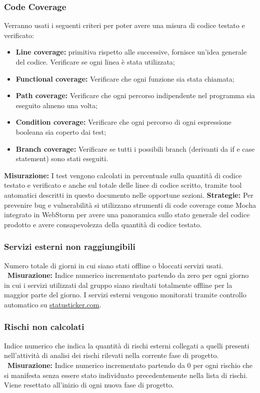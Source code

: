 	 	\subsubsection{Code Coverage} Verranno usati i seguenti criteri per poter avere una misura di codice testato e verificato:\newline
	 		\begin{itemize}
	 			\item \textbf{Line coverage:} primitiva rispetto alle successive, fornisce un’idea generale del codice. Verificare se ogni linea è stata utilizzata;
	 			\item \textbf{Functional coverage:} Verificare che ogni funzione sia stata chiamata;
	 			\item \textbf{Path coverage:} Verificare che ogni percorso indipendente nel programma sia eseguito almeno una volta;
	 			\item \textbf{Condition coverage:} Verificare che ogni percorso di ogni espressione booleana sia coperto dai test;
	 			\item \textbf{Branch coverage:} Verificare se tutti i possibili branch (derivanti da if e case statement) sono stati eseguiti.
	 		\end{itemize}
	 \textbf{Misurazione:} I test vengono calcolati in percentuale sulla quantità di codice testato e verificato e anche sul totale delle linee di codice scritto, tramite tool automatici descritti in questo documento nelle opportune sezioni.\newline \newline
	 \textbf{Strategie:} Per prevenire bug e vulnerabilità si utilizzano strumenti di code coverage come Mocha integrato in WebStorm per avere una panoramica sullo stato generale del codice prodotto e avere consapevolezza della quantità di codice testato.
	 \subsubsection{Servizi esterni non raggiungibili} Numero totale di giorni in cui siano stati offline o bloccati servizi usati.\newline
		 ~\newline\textbf{Misurazione:} Indice numerico incrementato partendo da zero per ogni giorno
in cui i servizi utilizzati dal gruppo siano risultati totalmente offline per la maggior parte del giorno. I servizi esterni vengono monitorati tramite controllo automatico su \url{statusticker.com}.\newline
		\subsubsection{Rischi non calcolati} Indice numerico che indica la quantità di rischi esterni collegati a quelli presenti nell’attività di
analisi dei rischi rilevati nella corrente fase di progetto.
\newline
		~\newline\textbf{Misurazione:} Indice numerico incrementato partendo da 0 per ogni rischio che
si manifesta senza essere stato individuato precedentemente nella lista di rischi.
		Viene resettato all’inizio di ogni nuova fase di progetto.
		\newline
